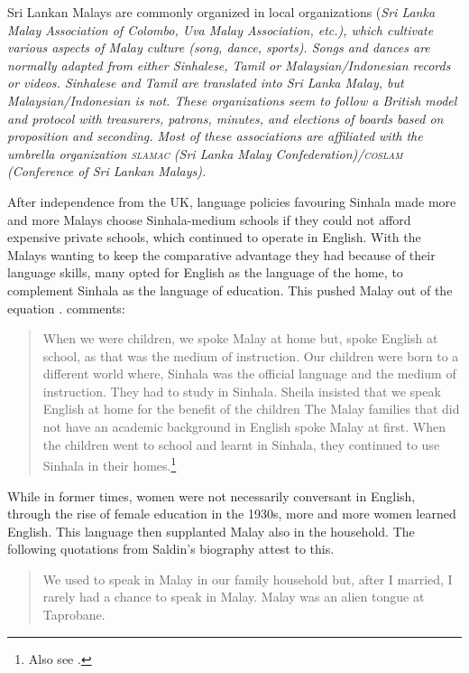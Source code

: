 Sri Lankan Malays are commonly organized in local organizations (\em Sri Lanka Malay Association of Colombo, Uva Malay Association\em, etc.), which cultivate various aspects of Malay culture (song, dance, sports). Songs and dances are normally adapted from either Sinhalese, Tamil or Malaysian/Indonesian records or videos. Sinhalese and Tamil are translated into Sri Lanka Malay, but Malaysian/Indonesian is not. These organizations seem to follow a British model and protocol with treasurers, patrons, minutes, and elections of boards based on proposition and seconding. Most of these associations are affiliated with the umbrella organization \textsc{slamac} (Sri Lanka Malay Confederation)/\textsc{coslam} (Conference of Sri Lankan Malays).
 
After independence from the UK, language policies favouring Sinhala made more and more Malays choose Sinhala-medium schools  if they could not afford expensive private schools, which continued to operate in English.
With the Malays wanting to keep the comparative advantage they had because of their language skills, many opted for English as the language of the home, to complement Sinhala as the language of education. This pushed Malay out of the equation \citep[29f]{Bichsel}. \citet[76]{Saldin2003} comments:

\begin{quote}
    When we were children, we spoke Malay at home but, spoke  English at school, as that was the medium of instruction. Our children were born to a different world where, Sinhala was the official language  and the medium of instruction. They had to study in Sinhala. \el Sheila insisted that we speak English at home for the benefit of the children \el The Malay families that did not have an academic background in English spoke Malay at first. When the children went to school and learnt in Sinhala, they continued to use Sinhala in their homes.\footnote{Also see \citet{Hussainmiya1990,%
AnsaldoEtAl2006fel,
LimEtAl2007,
Ansaldo2008genesis}.}
\end{quote}


While in former times, women were not necessarily conversant in English, through the rise of female education in the 1930s, more and more women learned English. This language then supplanted Malay also in the household. The following quotations from Saldin's biography attest to this.


\begin{quote}
    We used to speak in Malay in our family household but, after I married, I rarely had a chance to speak in Malay. Malay was an alien tongue at Taprobane. \citep[76]{Saldin2003}
\end{quote}

